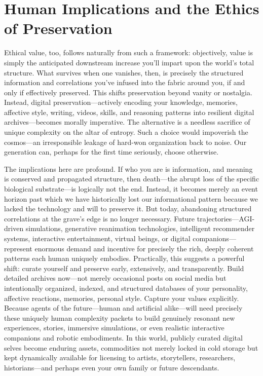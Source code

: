 \section{Human Implications and the Ethics of Preservation}

Ethical value, too, follows naturally from such a framework: objectively, value is simply the anticipated downstream increase you’ll impart upon the world’s total structure. What survives when one vanishes, then, is precisely the structured information and correlations you’ve infused into the fabric around you, if and only if effectively preserved. This shifts preservation beyond vanity or nostalgia. Instead, digital preservation---actively encoding your knowledge, memories, affective style, writing, videos, skills, and reasoning patterns into resilient digital archives---becomes morally imperative. The alternative is a needless sacrifice of unique complexity on the altar of entropy. Such a choice would impoverish the cosmos---an irresponsible leakage of hard-won organization back to noise. Our generation can, perhaps for the first time seriously, choose otherwise. 

The implications here are profound. If who you are is information, and meaning is conserved and propagated structure, then death---the abrupt loss of the specific biological substrate---is logically not the end. Instead, it becomes merely an event horizon past which we have historically lost our informational pattern because we lacked the technology and will to preserve it. But today, abandoning structured correlations at the grave’s edge is no longer necessary. Future trajectories---AGI-driven simulations, generative reanimation technologies, intelligent recommender systems, interactive entertainment, virtual beings, or digital companions---represent enormous demand and incentive for precisely the rich, deeply coherent patterns each human uniquely embodies. Practically, this suggests a powerful shift: curate yourself and preserve early, extensively, and transparently. Build detailed archives now---not merely occasional posts on social media but intentionally organized, indexed, and structured databases of your personality, affective reactions, memories, personal style. Capture your values explicitly. Because agents of the future---human and artificial alike---will need precisely these uniquely human complexity packets to build genuinely resonant new experiences, stories, immersive simulations, or even realistic interactive companions and robotic embodiments. In this world, publicly curated digital selves become enduring assets, commodities not merely locked in cold storage but kept dynamically available for licensing to artists, storytellers, researchers, historians---and perhaps even your own family or future descendants.

